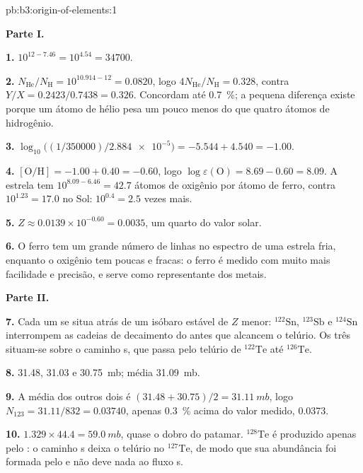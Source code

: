 \begin{solution}{pb:b3:origin-of-elements:1}

\textbf{Parte I.}

\textbf{1.} $10^{12 - 7.46} = 10^{4.54} = \num{34700}$.

\textbf{2.} $N_\mathrm{He}/N_\mathrm{H} = 10^{10.914 - 12} = \num{0.0820}$, logo
$4N_\mathrm{He}/N_\mathrm{H} = \num{0.328}$, contra $Y/X =
0.2423/0.7438 = \num{0.326}$. Concordam até \qty{0.7}{\percent}; a
pequena diferença existe porque um átomo de hélio pesa um pouco menos do que quatro
átomos de hidrogênio.

\textbf{3.} $\log_{10}\bigl((1/350000)/\num{2.884e-5}\bigr) = -5.544 + 4.540 =
-1.00$.

\textbf{4.} $[\mathrm{O/H}] = -1.00 + 0.40 = -0.60$, logo
$\log\varepsilon(\mathrm{O}) = 8.69 - 0.60 = 8.09$. A estrela tem
$10^{8.09 - 6.46} = 42.7$ átomos de oxigênio por átomo de ferro, contra
$10^{1.23} = 17.0$ no Sol: $10^{0.4} = 2.5$ vezes mais.

\textbf{5.} $Z \approx 0.0139\times10^{-0.60} = \num{0.0035}$, um quarto do valor
solar.

\textbf{6.} O ferro tem um grande número de linhas no espectro de uma estrela fria, enquanto
o oxigênio tem poucas e fracas: o ferro é medido com muito mais
facilidade e precisão, e serve como representante dos metais.

\textbf{Parte II.}

\textbf{7.} Cada um se situa atrás de um isóbaro estável de $Z$ menor:
$^{122}\mathrm{Sn}$, $^{123}\mathrm{Sb}$ e $^{124}\mathrm{Sn}$ interrompem
as cadeias de decaimento do  antes que alcancem o telúrio. Os três situam-se
sobre o caminho s, que passa pelo telúrio de $^{122}\mathrm{Te}$ até
$^{126}\mathrm{Te}$.

\textbf{8.} \num{31.48}, \num{31.03} e \qty{30.75}{mb}; média
\qty{31.09}{mb}.

\textbf{9.} A média dos outros dois é $(31.48 + 30.75)/2 = \qty{31.11}{mb}$,
logo $N_{123} = 31.11/832 = \num{0.03740}$, apenas \qty{0.3}{\percent}
acima do valor medido, \num{0.0373}.

\textbf{10.} $1.329\times44.4 = \qty{59.0}{mb}$, quase o dobro do patamar.
$^{128}\mathrm{Te}$ é produzido apenas pelo : o caminho s deixa o telúrio no
$^{127}\mathrm{Te}$, de modo que sua abundância foi formada pelo  e
não deve nada ao fluxo s.


\end{solution}

